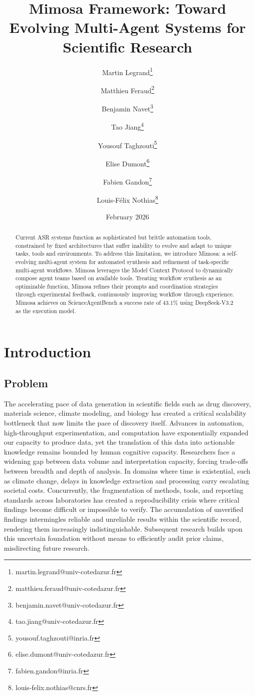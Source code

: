 \documentclass{article}
\title{Mimosa Framework: Toward Evolving Multi-Agent Systems for Scientific Research}
\date{February 2026}
\author[1,2]{Martin Legrand\thanks{martin.legrand@univ-cotedazur.fr}}
\author[1,2]{Matthieu Feraud\thanks{matthieu.feraud@univ-cotedazur.fr}}
\author[1, 2, 3]{Benjamin Navet\thanks{benjamin.navet@univ-cotedazur.fr}}
\author[1,2]{Tao Jiang\thanks{tao.jiang@univ-cotedazur.fr}}
\author[2, 3]{Yousouf Taghzouti\thanks{yousouf.taghzouti@inria.fr}}
\author[1]{Elise Dumont\thanks{elise.dumont@univ-cotedazur.fr}}
\author[2, 3]{Fabien Gandon\thanks{fabien.gandon@inria.fr}}
\author[1,2]{Louis-F\'elix Nothias\thanks{louis-felix.nothias@cnrs.fr}}
\affil[1]{Universit\'e C\^ote d'Azur, CNRS, ICN, Nice, France}
\affil[2]{Interdisciplinary Institute for Artificial Intelligence (3iA) C\^ote d'Azur, Sophia-Antipolis, France}
\affil[3]{INRIA, Université Côte d’Azur, CNRS, France }
\begin{document}
\maketitle

\begin{abstract}
Current ASR systems function as sophisticated but brittle automation tools, constrained by fixed architectures that suffer inability to evolve and adapt to unique tasks, tools and environments. To address this limitation, we introduce Mimosa: a self-evolving multi-agent system for automated synthesis and refinement of task-specific multi-agent workflows. Mimosa leverages the Model Context Protocol to dynamically compose agent teams based on available tools. Treating workflow synthesis as an optimizable function, Mimosa  refines their prompts and coordination strategies through experimental feedback, continuously improving workflow through experience. Mimosa achieves on ScienceAgentBench a success rate of 43.1\% using DeepSeek-V3.2 as the execution model.

\end{abstract}

\section{Introduction}

\subsection{Problem}


The accelerating pace of data generation in scientific fields such as drug discovery, materials science, climate modeling, and biology has created a critical scalability bottleneck that now limits the pace of discovery itself. Advances in automation, high-throughput experimentation, and computation have exponentially expanded our capacity to produce data, yet the translation of this data into actionable knowledge remains bounded by human cognitive capacity. Researchers face a widening gap between data volume and interpretation capacity, forcing trade-offs between breadth and depth of analysis. In domains where time is existential, such as climate change, delays in knowledge extraction and processing carry escalating societal costs.
Concurrently, the fragmentation of methods, tools, and reporting standards across laboratories has created a reproducibility crisis where critical findings become difficult or impossible to verify. The accumulation of unverified findings intermingles reliable and unreliable results within the scientific record, rendering them increasingly indistinguishable. Subsequent research builds upon this uncertain foundation without means to efficiently audit prior claims, misdirecting future research.
\end{document}
